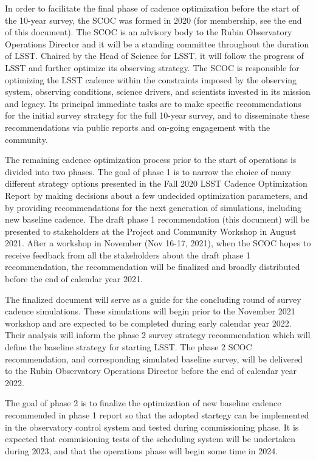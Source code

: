 In order to facilitate the final phase of cadence optimization before the start of the 10-year 
survey, the SCOC was formed in 2020 (for membership, see the end of this document). The 
SCOC is an advisory  body to the Rubin Observatory  Operations  Director and it will be a 
standing committee throughout the duration of LSST. Chaired by the Head of Science for LSST, it will follow the progress of LSST and further optimize its observing strategy. The SCOC is responsible for optimizing the LSST cadence  within the constraints imposed by the observing system, observing conditions, science drivers, and scientists invested in its mission and legacy. Its principal immediate tasks are to make specific recommendations for the initial survey strategy for the full 10-year survey, and to disseminate these recommendations via public reports and on-going engagement with the community. 

The remaining cadence optimization process prior to the start of operations is divided into two phases. The goal of phase 1 is to narrow the choice of many different strategy options presented in the Fall 2020 LSST Cadence Optimization Report by making decisions about a few undecided optimization parameters, and by providing recommendations for the next generation of simulations, including new baseline cadence. The draft phase 1 recommendation (this document) will be presented to stakeholders at the Project and Community Workshop in August 2021. After a workshop in November (Nov 16-17, 2021), when the SCOC hopes to receive feedback from all the stakeholders about the draft phase 1 recommendation, the recommendation will be finalized and broadly distributed before the end of calendar year 2021. 

The finalized document will serve as a guide for the concluding round of survey cadence 
simulations. These simulations will begin prior to the November 2021 workshop and are expected to be completed during early calendar year 2022. Their analysis will inform the phase 2 survey strategy recommendation which will define the baseline strategy for starting LSST. The phase 2 SCOC recommendation, and corresponding simulated baseline survey, will be delivered to the Rubin Observatory Operations Director before the end of calendar year 2022. 

The goal of phase 2 is to finalize the optimization of new baseline cadence recommended
in phase 1 report so that the adopted startegy can be implemented in the observatory 
control system and tested during commissioning phase. It is expected that commisioning 
tests of the scheduling system will be undertaken during 2023, and that the operations 
phase will begin some time in 2024.



